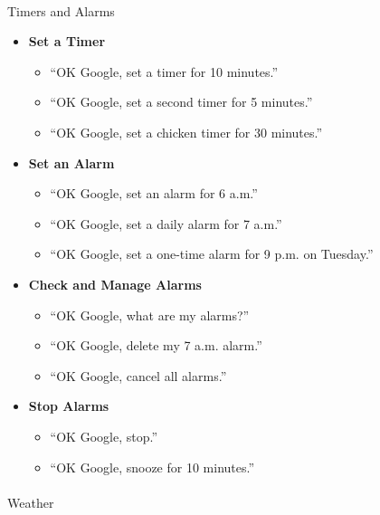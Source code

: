 \documentclass[
  a4paper,
]{article}
\makeatletter
\let\oldparagraph\paragraph
\renewcommand{\paragraph}{
    \@ifstar
      \xxxParagraphStar
      \xxxParagraphNoStar
  }
\newcommand{\xxxParagraphStar}[1]{\oldparagraph*{#1}\mbox{}}
\newcommand{\xxxParagraphNoStar}[1]{\oldparagraph{#1}\mbox{}}
\providecommand{\tightlist}{%
  \setlength{\itemsep}{0pt}\setlength{\parskip}{0pt}}\usepackage{longtable,booktabs,array}
\makeatother
\begin{document}
\paragraph{Timers and Alarms}\label{timers-and-alarms}

\begin{itemize}
\tightlist
\item
  \textbf{Set a Timer}

  \begin{itemize}
  \tightlist
  \item
    ``OK Google, set a timer for 10 minutes.''
  \item
    ``OK Google, set a second timer for 5 minutes.''
  \item
    ``OK Google, set a chicken timer for 30 minutes.''
  \end{itemize}
\item
  \textbf{Set an Alarm}

  \begin{itemize}
  \tightlist
  \item
    ``OK Google, set an alarm for 6 a.m.''
  \item
    ``OK Google, set a daily alarm for 7 a.m.''
  \item
    ``OK Google, set a one-time alarm for 9 p.m. on Tuesday.''
  \end{itemize}
\item
  \textbf{Check and Manage Alarms}

  \begin{itemize}
  \tightlist
  \item
    ``OK Google, what are my alarms?''
  \item
    ``OK Google, delete my 7 a.m. alarm.''
  \item
    ``OK Google, cancel all alarms.''
  \end{itemize}
\item
  \textbf{Stop Alarms}

  \begin{itemize}
  \tightlist
  \item
    ``OK Google, stop.''
  \item
    ``OK Google, snooze for 10 minutes.''
  \end{itemize}
\end{itemize}

\paragraph{Weather}\label{weather}
\end{document}
